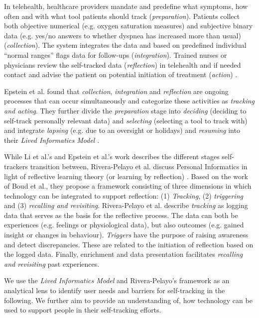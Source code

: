 In telehealth, healthcare providers mandate and predefine what symptoms, how often and with what tool patients should track (\textit{preparation}). Patients collect both objective numerical (e.g. oxygen saturation measures) and subjective binary data (e.g. yes/no answers to whether dyspnea has increased more than usual) (\textit{collection}). The system integrates the data and based on predefined individual “normal ranges” flags data for follow-ups (\textit{integration}). Trained nurses or physicians review the self-tracked data (\textit{reflection}) in telehealth and if needed contact and advise the patient on potential initiation of treatment (\textit{action}) \cite{piloting, pedone}. 

Epstein et al. found that \textit{collection}, \textit{integration} and \textit{reflection} are ongoing processes that can occur simultaneously and categorize these activities as \textit{tracking and acting}. They further divide the \textit{preparation} stage into \textit{deciding} (deciding to self-track personally relevant data) and \textit{selecting} (selecting a tool to track with) and integrate \textit{lapsing} (e.g. due to an oversight or holidays) and \textit{resuming} into their \textit{Lived Informatics Model} \cite{Epstein2015, Rooksby2014}. 

While Li et al.’s and Epstein et al.’s work describes the different stages self-trackers transition between, Rivera-Pelayo et al. discuss Personal Informatics in light of reflective learning theory (or learning by reflection) \cite{Rivera}. Based on the work of Boud et al., they propose a framework consisting of three dimensions in which technology can be integrated to support reflection: (1) \textit{Tracking}, (2) \textit{triggering} and (3) \textit{recalling and revisiting}. Rivera-Pelayo et al. describe \textit{tracking} as logging data that serves as the basis for the reflective process. The data can both be experiences (e.g. feelings or physiological data), but also outcomes (e.g. gained insight or changes in behaviour). \textit{Triggers} have the purpose of raising awareness and detect discrepancies. These are related to the initiation of reflection based on the logged data. Finally, enrichment and data presentation facilitates \textit{recalling and revisiting} past experiences. 

We use the \textit{Lived Informatics Model} \cite{Epstein2015} and Rivera-Pelayo’s framework as an analytical lens to identify user needs and barriers for self-tracking in the following. We further aim to provide an understanding of, how technology can be used to support people in their self-tracking efforts. 

